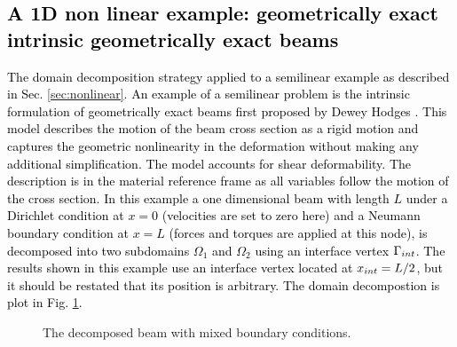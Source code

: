 \documentclass[11pt,a4paper]{article}
\newcommand{\revtwo}[1]{{\textcolor{black}{#1}}}
\begin{document}
\revtwo{
\subsection{A 1D non linear example: geometrically exact intrinsic geometrically exact beams}\label{sec:intrinsic_nonlinear_beam}
The domain decomposition strategy applied to a semilinear example as described in Sec. \ref{sec:nonlinear}. An example of a semilinear problem is the intrinsic formulation of geometrically exact beams first proposed by Dewey Hodges \cite{hodges2003intrinsic}. This model describes the motion of the beam cross section as a rigid motion and captures the geometric nonlinearity in the deformation without making any additional simplification. The model accounts for shear deformability. The description is in the material reference frame as all variables follow the motion of the cross section. 
In this example a one dimensional beam with length $L$ under a Dirichlet condition at $x=0$ (velocities are set to zero here) and a Neumann boundary condition at $x=L$ (forces and torques are applied at this node), is decomposed into two subdomains $\Omega_1$ and $\Omega_2$ using an interface vertex $\Gamma_{\rm int}$. The results shown in this example use an interface vertex located at $x_{\rm int}=L/2$, but it should be restated that its position is arbitrary. The domain decompostion is plot in Fig. \ref{fig:nonlinear_beam}.}
\begin{figure}[h]
\centering
\caption{The decomposed beam with mixed boundary conditions.}
\label{fig:nonlinear_beam}
\end{figure}
\end{document}
